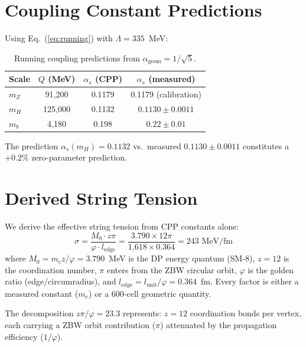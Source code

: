 \documentclass[12pt,a4paper]{article}
\begin{document}
\section{Coupling Constant Predictions}

Using Eq.~(\ref{eq:running}) with $\Lambda = 335$~MeV:

\begin{table}[h]
\centering
\caption{Running coupling predictions from $\alpha_{\mathrm{geom}} = 1/\sqrt{5}$.}
\label{tab:alphas}
\begin{tabular}{lccc}
\toprule
Scale & $Q$ (MeV) & $\alpha_s$ (CPP) & $\alpha_s$ (measured) \\
\midrule
$m_Z$ & 91,200 & 0.1179 & 0.1179 (calibration) \\
$m_H$ & 125,000 & 0.1132 & $0.1130 \pm 0.0011$ \\
$m_b$ & 4,180 & 0.198 & $0.22 \pm 0.01$ \\
\bottomrule
\end{tabular}
\end{table}

The prediction $\alpha_s(m_H) = 0.1132$ vs.\ measured $0.1130 \pm 0.0011$ constitutes a $+0.2\%$ zero-parameter prediction.

\section{Derived String Tension}
\label{sec:sigma}

We derive the effective string tension from CPP constants alone:
\begin{equation}
\boxed{\sigma = \frac{M_0 \cdot z\pi}{\varphi \cdot l_{\mathrm{edge}}} = \frac{3.790 \times 12\pi}{1.618 \times 0.364} = 243 \text{ MeV/fm}}
\label{eq:sigma}
\end{equation}
where $M_0 = m_e z/\varphi = 3.790$~MeV is the DP energy quantum (SM-8), $z = 12$ is the coordination number, $\pi$ enters from the ZBW circular orbit, $\varphi$ is the golden ratio (edge/circumradius), and $l_{\mathrm{edge}} = l_{\mathrm{unit}}/\varphi = 0.364$~fm. Every factor is either a measured constant ($m_e$) or a 600-cell geometric quantity.

The decomposition $z\pi/\varphi = 23.3$ represents: $z = 12$ coordination bonds per vertex, each carrying a ZBW orbit contribution ($\pi$) attenuated by the propagation efficiency ($1/\varphi$).
\end{document}
